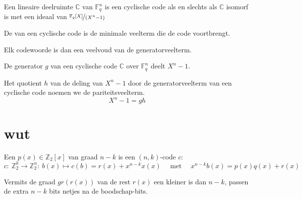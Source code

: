 \documentclass[main.tex]{subfiles}
\begin{document}
\begin{st}
  Een lineaire deelruimte $\mathbb{C}$ van $\mathbb{F}_{q}^{n}$ is een cyclische code als en slechts als $\mathbb{C}$ isomorf is met een ideaal van $\nicefrac{\mathbb{F}_{q}[X]}{(X^{n}-1)}$
\end{st}

\begin{de}
  De  van een cyclische code is de minimale veelterm die de code voortbrengt.
\end{de}

\begin{opm}
  Elk codewoorde is dan een veelvoud van de generatorveelterm.
\end{opm}

\begin{st}
  De generator $g$ van een cyclische code $\mathbb{C}$ over $\mathbb{F}_{q}^{n}$ deelt $X^{n}-1$.
\end{st}

\begin{de}
  Het quotient $h$ van de deling van $X^{n}-1$ door de generatorveelterm van een cyclische code noemen we de pariteitsveelterm.
  \[ X^{n}-1 = gh \]
\end{de}







\section{wut}




\begin{de}
  Een  $p(x)\in \mathbb{Z}_{2}[x]$ van graad $n-k$ is een $(n,k)$-code $c$:
  \[ c:\ \mathbb{Z}_{2}^{k} \rightarrow \mathbb{Z}_{2}^{n}:\ b(x) \mapsto c(b) = r(x) + x^{n-k}x(x) \quad\text{ met }\quad x^{n-k}b(x) = p(x)q(x) + r(x) \]
\end{de}

\begin{opm}
  Vermits de graad $gr(r(x))$ van de rest $r(x)$ een kleiner is dan $n-k$, passen de extra $n-k$ bits netjes na de boodschap-bits.
\end{opm}

\end{document}
